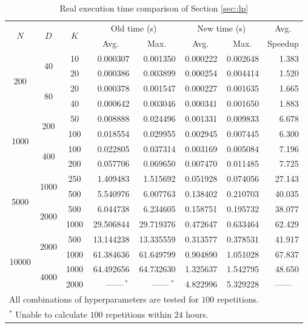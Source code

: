\documentclass{article}
\begin{document}
\begin{table}[!h]
  \centering
  \small
  \caption{Real execution time comparison of Section \ref{sec::lp}}
  \label{tbl::realtime1}
  \begin{tabular}{cccrrrrr}
    \toprule
      \multirow{2}{*}{$N$} & \multirow{2}{*}{$D$} & \multirow{2}{*}{$K$} & \multicolumn{2}{c}{Old time (s)} & \multicolumn{2}{c}{New time (s)} & \multicolumn{1}{c}{Avg.} \\ \cmidrule(lr){4-5} \cmidrule(lr){6-7}
      & & & \multicolumn{1}{c}{Avg.} & \multicolumn{1}{c}{Max.} & \multicolumn{1}{c}{Avg.} & \multicolumn{1}{c}{Max.} & \multicolumn{1}{c}{Speedup} \\
    \midrule
    \multirow{4}{*}{200} & \multirow{2}{*}{40} & 10 & 0.000307 & 0.001350 & 0.000222 & 0.002648 & 1.383
    \\
    & & 20 & 0.000386 & 0.003899 & 0.000254 & 0.004414 & 1.520
    \\
    & \multirow{2}{*}{80} & 20 & 0.000378 & 0.001547 & 0.000227 & 0.001635 & 1.665
    \\
    & & 40 & 0.000642 & 0.003046 & 0.000341 & 0.001650 & 1.883
    \\
    \multirow{4}{*}{1000} & \multirow{2}{*}{200} & 50 & 0.008888 & 0.024496 & 0.001331 & 0.009833 & 6.678
    \\
    & & 100 & 0.018554 & 0.029955 & 0.002945 & 0.007445 & 6.300
    \\
    & \multirow{2}{*}{400} & 100 & 0.022805 & 0.037314 & 0.003169 & 0.005084 & 7.196
    \\
    & & 200 & 0.057706 & 0.069650 & 0.007470 & 0.011485 & 7.725
    \\
    \multirow{4}{*}{5000} & \multirow{2}{*}{1000} & 250 & 1.409483 & 1.515692 & 0.051928 & 0.074056 & 27.143
    \\
    & & 500 & 5.540976 & 6.007763 & 0.138402 & 0.210703 & 40.035
    \\
    & \multirow{2}{*}{2000} & 500 & 6.044738 & 6.234605 & 0.158751 & 0.195732 & 38.077
    \\
    & & 1000 & 29.506844 & 29.719376 & 0.472647 & 0.633464 & 62.429
    \\
    \multirow{4}{*}{10000} & \multirow{2}{*}{2000} & 500 & 13.144238 & 13.335559 & 0.313577 & 0.378531 & 41.917
    \\
    & & 1000 & 61.384636 & 61.649799 & 0.904890 & 1.051028 & 67.837
    \\
    & \multirow{2}{*}{4000} & 1000 & 64.492656 & 64.732630 & 1.325637 & 1.542795 & 48.650
    \\
    & & 2000 & \multicolumn{1}{c}{~~~------$~^*$} & \multicolumn{1}{c}{~~~------$~^*$} & 4.822996 & 5.329228 & \multicolumn{1}{c}{------}
    \\
    \bottomrule
    \multicolumn{7}{l}{All combinations of hyperparameters are tested for $100$ repetitions.}\\
    \multicolumn{7}{l}{$^*$ Unable to calculate $100$ repetitions within $24$ hours.}\\
  \end{tabular}
\end{table}
\end{document}
